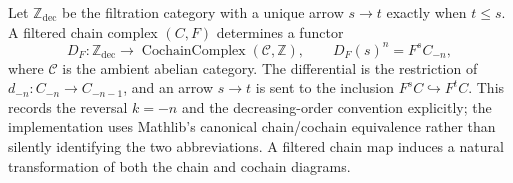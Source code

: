 \begin{definition}
  \label{def:filtered-complex-cochain-diagram}
  \leanok
  Let $\mathbb Z_{\mathrm{dec}}$ be the filtration category with a unique arrow
  $s\to t$ exactly when $t\le s$.  A filtered chain complex $(C,F)$ determines
  a functor
  \[
    D_F:\mathbb Z_{\mathrm{dec}}\longrightarrow
      \operatorname{CochainComplex}(\mathcal C,\mathbb Z),
    \qquad D_F(s)^n=F^sC_{-n},
  \]
  where $\mathcal C$ is the ambient abelian category.
  The differential is the restriction of $d_{-n}:C_{-n}\to C_{-n-1}$, and an
  arrow $s\to t$ is sent to the inclusion $F^sC\hookrightarrow F^tC$.  This
  records the reversal $k=-n$ and the decreasing-order convention explicitly;
  the implementation uses Mathlib's canonical chain/cochain equivalence rather
  than silently identifying the two abbreviations.  A filtered chain map
  induces a natural transformation of both the chain and cochain diagrams.
\end{definition}












